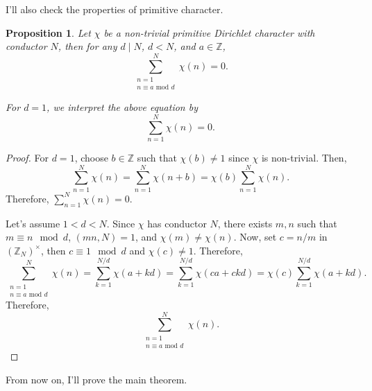 \documentclass[a4paper, 12pt]{article}
\theoremstyle{Mydefinition}
\theoremstyle{Mytheorem}
\newtheorem{proposition}[statement]{Proposition}
\begin{document}
I'll also check the properties of primitive character.
\begin{proposition}\label{prop_char}
Let $\chi$ be a non-trivial primitive Dirichlet character with conductor $N$, then for any $d\mid N$, $d<N$, and $a\in \mathbb{Z}$,
\begin{equation*}
    \sum^N_{\substack{n=1 \\ n\equiv a \textrm{ mod } d}} \chi(n) = 0.
\end{equation*}

For $d=1$, we interpret the above equation by
\begin{equation*}
    \sum^N_{n=1} \chi(n) = 0.
\end{equation*}

\end{proposition}
\begin{proof}
For $d=1$, choose $b\in \mathbb{Z}$ such that $\chi(b)\neq 1$ since $\chi$ is non-trivial. Then,
\begin{equation*}
    \sum^N_{n=1} \chi(n) = \sum^N_{n=1} \chi(n+b) = \chi(b)\sum^N_{n=1} \chi(n).
\end{equation*}
Therefore, $\sum^N_{n=1} \chi(n) = 0$.

Let's assume $1<d<N$. Since $\chi$ has conductor $N$, there exists $m,n$ such that $m\equiv n \mod d$, $(mn, N) = 1$, and $\chi(m) \neq \chi(n)$. Now, set $c = n/m$ in $\left(\mathbb{Z}_N\right)^\times$, then $c\equiv 1\mod d$ and $\chi(c)\neq 1$. Therefore,
\begin{equation*}
    \sum^N_{\substack{n=1 \\ n\equiv a \textrm{ mod } d}} \chi(n) = \sum_{k=1}^{N/d} \chi(a+kd) = \sum_{k=1}^{N/d} \chi(ca+ckd) = \chi(c)\sum_{k=1}^{N/d} \chi(a+kd).
\end{equation*}
Therefore, 
\begin{equation*}
    \sum^N_{\substack{n=1 \\ n\equiv a \textrm{ mod } d}} \chi(n).
\end{equation*}
\end{proof}

From now on, I'll prove the main theorem.
\end{document}
